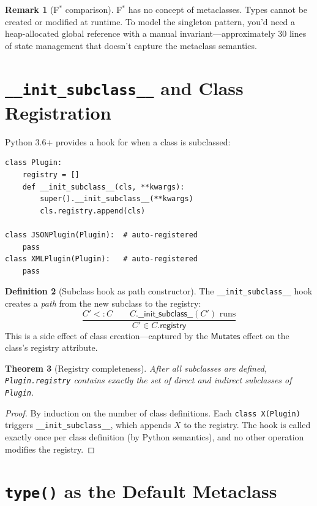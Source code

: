 \documentclass[11pt,a4paper]{report}
\theoremstyle{definition}
\newtheorem{definition}{Definition}[chapter]
\newtheorem{remark}[definition]{Remark}
\theoremstyle{plain}
\newtheorem{theorem}[definition]{Theorem}
\newcommand{\Mutates}{\mathsf{Mutates}}
\newcommand{\fstar}{F$^{*}$}
\begin{document}
\begin{remark}[\fstar{} comparison]
\fstar{} has no concept of metaclasses. Types cannot be created or modified at
runtime. To model the singleton pattern, you'd need a heap-allocated global reference
with a manual invariant---approximately 30 lines of state management that doesn't
capture the metaclass semantics.
\end{remark}

\section{\texttt{\_\_init\_subclass\_\_} and Class Registration}

Python 3.6+ provides a hook for when a class is subclassed:
\begin{lstlisting}[style=python]
class Plugin:
    registry = []
    def __init_subclass__(cls, **kwargs):
        super().__init_subclass__(**kwargs)
        cls.registry.append(cls)

class JSONPlugin(Plugin):  # auto-registered
    pass
class XMLPlugin(Plugin):   # auto-registered
    pass
\end{lstlisting}

\begin{definition}[Subclass hook as path constructor]
The \lstinline[style=python]{__init_subclass__} hook creates a \emph{path}
from the new subclass to the registry:
\[
  \frac{
    C' <: C \qquad
    C.\mathsf{\_\_init\_subclass\_\_}(C') \text{ runs}
  }{
    C' \in C.\mathsf{registry}
  }
\]
This is a side effect of class creation---captured by the $\Mutates$ effect on
the class's registry attribute.
\end{definition}

\begin{theorem}[Registry completeness]
After all subclasses are defined, \texttt{Plugin.registry} contains exactly
the set of direct and indirect subclasses of \texttt{Plugin}.
\end{theorem}
\begin{proof}
By induction on the number of class definitions.  Each
\lstinline[style=python]{class X(Plugin)} triggers
\lstinline[style=python]{__init_subclass__}, which appends $X$ to the registry.
The hook is called exactly once per class definition (by Python semantics),
and no other operation modifies the registry.
\end{proof}

\section{\texttt{type()} as the Default Metaclass}
\end{document}
